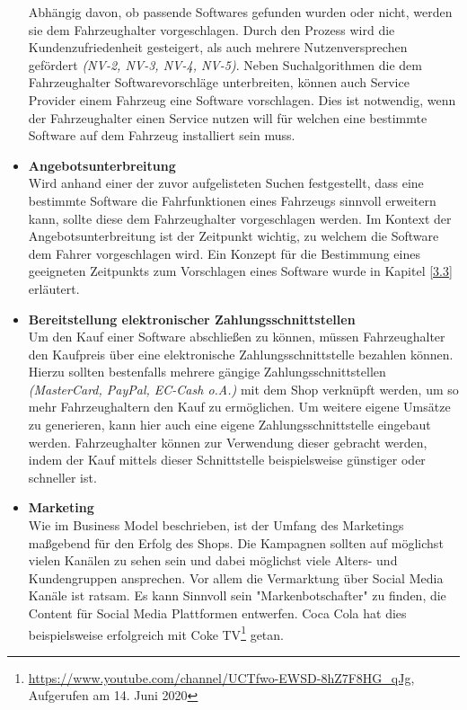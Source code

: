 \begin{itemize}
	Abhängig davon, ob passende Softwares gefunden wurden oder nicht, werden sie dem Fahrzeughalter vorgeschlagen. Durch den Prozess wird die Kundenzufriedenheit gesteigert, als auch mehrere Nutzenversprechen gefördert \textit{(NV-2, NV-3, NV-4, NV-5)}. Neben Suchalgorithmen die dem Fahrzeughalter Softwarevorschläge unterbreiten, können auch Service Provider einem Fahrzeug eine Software vorschlagen. Dies ist notwendig, wenn der Fahrzeughalter einen Service nutzen will für welchen eine bestimmte Software auf dem Fahrzeug installiert sein muss.

	\item[] \hspace{-0.6cm} \textbf{Angebotsunterbreitung}\\
	Wird anhand einer der zuvor aufgelisteten Suchen festgestellt, dass eine bestimmte Software die Fahrfunktionen eines Fahrzeugs sinnvoll erweitern kann, sollte diese dem Fahrzeughalter vorgeschlagen werden. Im Kontext der Angebotsunterbreitung ist der Zeitpunkt wichtig, zu welchem die Software dem Fahrer vorgeschlagen wird. Ein Konzept für die Bestimmung eines geeigneten Zeitpunkts zum Vorschlagen eines Software wurde in Kapitel \ref{3.3} erläutert.
	
	\item[] \hspace{-0.6cm} \textbf{Bereitstellung elektronischer Zahlungsschnittstellen}\\
	Um den Kauf einer Software abschließen zu können, müssen Fahrzeughalter den Kaufpreis über eine elektronische Zahlungsschnittstelle bezahlen können. Hierzu sollten bestenfalls mehrere gängige Zahlungsschnittstellen \textit{(MasterCard, PayPal, EC-Cash o.A.)} mit dem Shop verknüpft werden, um so mehr Fahrzeughaltern den Kauf zu ermöglichen. Um weitere eigene Umsätze zu generieren, kann hier auch eine eigene Zahlungsschnittstelle eingebaut werden. Fahrzeughalter können zur Verwendung dieser gebracht werden, indem der Kauf mittels dieser Schnittstelle beispielsweise günstiger oder schneller ist.\\
	
	\item[] \hspace{-0.6cm} \textbf{Marketing}\\
	Wie im Business Model beschrieben, ist der Umfang des Marketings maßgebend für den Erfolg des Shops. Die Kampagnen sollten auf möglichst vielen Kanälen zu sehen sein und dabei möglichst viele Alters- und Kundengruppen ansprechen. Vor allem die Vermarktung über Social Media Kanäle ist ratsam. Es kann Sinnvoll sein "Markenbotschafter" zu finden, die Content für Social Media Plattformen entwerfen. Coca Cola hat dies beispielsweise erfolgreich mit Coke TV\footnote{\url{https://www.youtube.com/channel/UCTfwo-EWSD-8hZ7F8HG_qJg}, Aufgerufen am 14. Juni 2020} getan.
\end{itemize}
